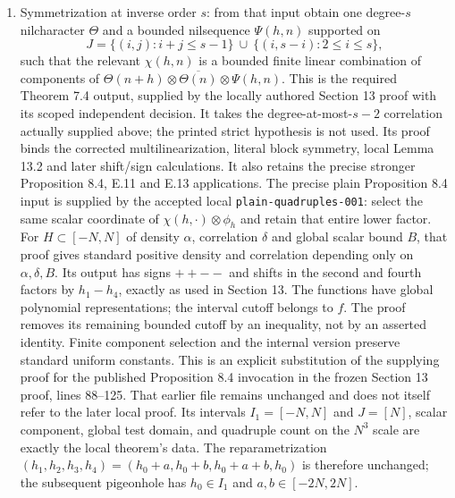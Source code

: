 \documentclass[11pt]{article}
\begin{document}
\begin{enumerate}
The centered fractional-part convention in this chain is
$(-1/2,1/2]$, a fixed fundamental cube permitted by Section 12.
The reconstruction's acceptance remains conditional on its suppliers;
the affine-offset coefficient transfer is supplied by the local multifactor lemma, as connected below.
\item Symmetrization at inverse order $s$: from that input obtain one
degree-$s$ nilcharacter $\Theta$ and a bounded nilsequence $\Psi(h,n)$
supported on
\begin{equation}\label{eq:J}
 J=\{(i,j):i+j\leq s-1\}\ \cup\ \{(i,s-i):2\leq i\leq s\},
\end{equation}
such that the relevant $\chi(h,n)$ is a bounded finite linear combination
of components of
$\Theta(n+h)\otimes\overline{\Theta(n)}\otimes\Psi(h,n)$.
This is the required Theorem 7.4 output, supplied by the locally authored
Section 13 proof with its scoped independent decision. It takes the
degree-at-most-$s-2$ correlation actually supplied above; the printed
strict hypothesis is not used. Its proof binds the corrected
multilinearization, literal block symmetry, local Lemma 13.2 and later
shift/sign calculations. It also retains the precise stronger
Proposition 8.4, E.11 and E.13 applications. The precise plain
Proposition 8.4 input is supplied by the accepted local
\texttt{plain-quadruples-001}: select the same scalar coordinate of
$\chi(h,\cdot)\otimes\phi_h$ and retain that entire lower factor.
For $H\subset[-N,N]$ of density $\alpha$, correlation $\delta$ and
global scalar bound $B$, that proof gives standard positive density
and correlation depending only on $\alpha,\delta,B$. Its output has
signs $++--$ and shifts in the second and fourth factors by
$h_1-h_4$, exactly as used in Section 13. The functions have global
polynomial representations; the interval cutoff belongs to $f$.
The proof removes its remaining bounded cutoff by an inequality,
not by an asserted identity. Finite component selection and the
internal version preserve standard uniform constants.
This is an explicit substitution of the supplying proof for the
published Proposition 8.4 invocation in the frozen Section 13 proof,
lines 88--125. That earlier file remains unchanged and does not itself
refer to the later local proof. Its intervals $I_1=[-N,N]$ and $J=[N]$,
scalar component, global test domain, and quadruple count on the
$N^3$ scale are exactly the local theorem's data. The reparametrization
$(h_1,h_2,h_3,h_4)=(h_0+a,h_0+b,h_0+a+b,h_0)$ is therefore unchanged;
the subsequent pigeonhole has $h_0\in I_1$ and $a,b\in[-2N,2N]$.

\end{enumerate}
\end{document}
